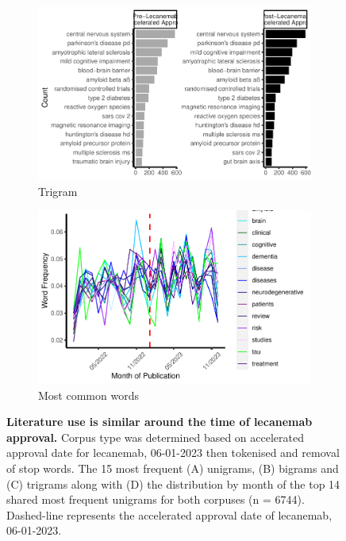 \documentclass[
  a4paper,
]{article}
\begin{document}
\begin{figure}
{\begin{figure}[H]
{\centering \includegraphics{report_pdf_files/figure-pdf/fig-tokenisation-3.pdf}

}

\caption{Trigram}

\end{figure}

\begin{figure}[H]

{\centering \includegraphics{report_pdf_files/figure-pdf/fig-tokenisation-4.pdf}

}

\caption{Most common words}

\end{figure}

}

\caption{\label{fig-tokenisation}\textbf{Literature use is similar
around the time of lecanemab approval.} Corpus type was determined based
on accelerated approval date for lecanemab, 06-01-2023 then tokenised
and removal of stop words. The 15 most frequent (A) unigrams, (B)
bigrams and (C) trigrams along with (D) the distribution by month of the
top 14 shared most frequent unigrams for both corpuses (n = 6744).
Dashed-line represents the accelerated approval date of lecanemab,
06-01-2023.}

\end{figure}
\end{document}
